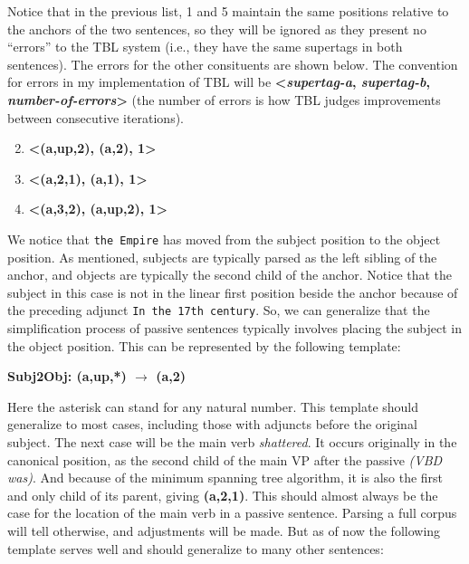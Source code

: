 \documentclass{article}
\begin{document}
Notice that in the previous list, 1 and 5 maintain the same positions relative to the anchors of the two sentences, so they will be ignored as they present no ``errors'' to the TBL system (i.e., they have the same supertags in both sentences). The errors for the other consituents are shown below. The convention for errors in my implementation of TBL will be \textbf{\textless\textit{supertag-a}, \textit{supertag-b}, \textit{number-of-errors}\textgreater} (the number of errors is how TBL judges improvements between consecutive iterations).

\begin{enumerate}
\setcounter{enumi}{1}
\item \textbf{\textless(a,up,2), (a,2), 1\textgreater}
\item \textbf{\textless(a,2,1), (a,1), 1\textgreater}
\item \textbf{\textless(a,3,2), (a,up,2), 1\textgreater}
\end{enumerate}

We notice that \texttt{the Empire} has moved from the subject position to the object position. As mentioned, subjects are typically parsed as the left sibling of the anchor, and objects are typically the second child of the anchor. Notice that the subject in this case is not in the linear first position beside the anchor because of the preceding adjunct \texttt{In the 17th century}. So, we can generalize that the simplification process of passive sentences typically involves placing the subject in the object position. This can be represented by the following template:

\begin{center}
\textbf{Subj2Obj: (a,up,*) $\rightarrow$ (a,2)}
\end{center}

Here the asterisk can stand for any natural number. This template should generalize to most cases, including those with adjuncts before the original subject. The next case will be the main verb \textit{shattered}. It occurs originally in the canonical position, as the second child of the main VP after the passive \textit{(VBD was)}. And because of the minimum spanning tree algorithm, it is also the first and only child of its parent, giving \textbf{(a,2,1)}. This should almost always be the case for the location of the main verb in a passive sentence. Parsing a full corpus will tell otherwise, and adjustments will be made. But as of now the following template serves well and should generalize to many other sentences:
\end{document}
